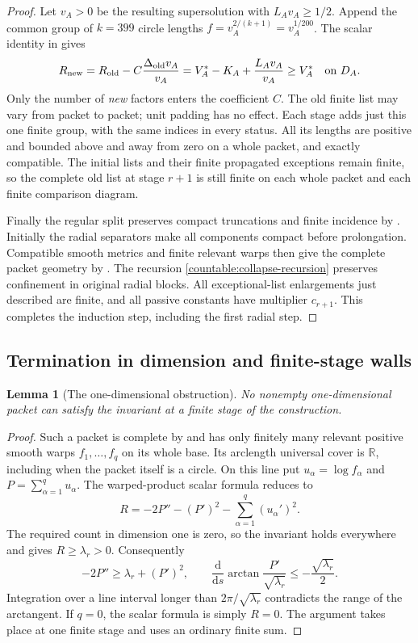 \documentclass[11pt]{article}
\numberwithin{equation}{section}
\newtheorem{lemma}[theorem]{Lemma}
\theoremstyle{definition}
\theoremstyle{remark}
\begin{document}
\begin{proof}
Let $v_A>0$ be the resulting supersolution with $L_Av_A\ge1/2$.
Append the common group of $k=399$ circle lengths
$f=v_A^{2/(k+1)}=v_A^{1/200}$. The scalar identity in
 gives
\[
 R_{\rm new}=R_{\rm old}-C\frac{\Delta_{\rm old}v_A}{v_A}
           =V_A^*-K_A+\frac{L_Av_A}{v_A}
           \ge V_A^*\quad\hbox{on }D_A.
\]
Only the number of \emph{new} factors enters the coefficient $C$.
The old finite list may vary from packet to packet; unit padding has
no effect. Each stage adds just this one finite group, with the same
indices in every status. All its lengths are positive and bounded
above and away from zero on a whole packet, and exactly compatible.
The initial lists and their finite propagated exceptions remain finite,
so the complete old list at stage $r+1$ is still finite on each whole
packet and each finite comparison diagram.

Finally the regular split preserves compact truncations and finite
incidence by . Initially the radial separators make
all components compact before prolongation. Compatible smooth metrics
and finite relevant warps then give the complete packet geometry by
. The recursion
\eqref{countable:collapse-recursion} preserves confinement in original
radial blocks. All exceptional-list enlargements just described are
finite, and all passive constants have multiplier $c_{r+1}$.
This completes the induction step, including the first radial step.
\end{proof}

\subsection{Termination in dimension and finite-stage walls}

\begin{lemma}[The one-dimensional obstruction]\label{countable:dimension-one}
No nonempty one-dimensional packet can satisfy the invariant at a
finite stage of the construction.
\end{lemma}

\begin{proof}
Such a packet is complete by  and has only
finitely many relevant positive smooth warps $f_1,\ldots,f_q$ on
its whole base. Its arclength universal cover is $\mathbb R$, including
when the packet itself is a circle. On this line put
$u_\alpha=\log f_\alpha$ and $P=\sum_{\alpha=1}^q u_\alpha$.
The warped-product scalar formula reduces to
\[
 R=-2P''-(P')^2-\sum_{\alpha=1}^q(u_\alpha')^2.
\]
The required count in dimension one is zero, so the invariant holds
everywhere and gives $R\ge\lambda_r>0$. Consequently
\[
 -2P''\ge\lambda_r+(P')^2,\qquad
 \frac{\mathrm d}{\mathrm d s}\arctan\frac{P'}{\sqrt{\lambda_r}}
 \le-\frac{\sqrt{\lambda_r}}2.
\]
Integration over a line interval longer than
$2\pi/\sqrt{\lambda_r}$ contradicts the range of the arctangent.
If $q=0$, the scalar formula is simply $R=0$. The argument takes
place at one finite stage and uses an ordinary finite sum.
\end{proof}
\end{document}
